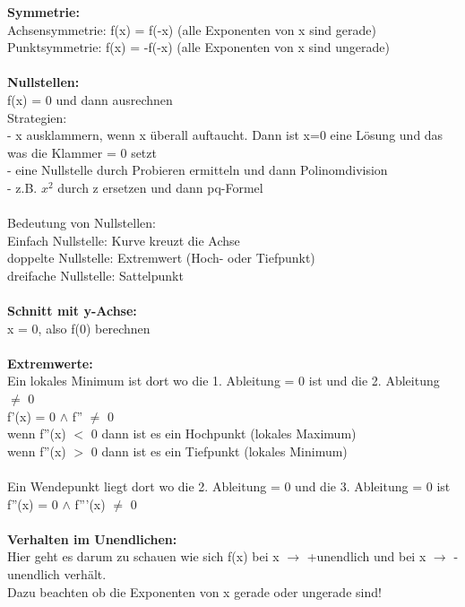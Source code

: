 \documentclass[6pt,a4paper]{scrartcl}
\begin{document}
\begin{multicols*}{2}
\textbf{Symmetrie:}\\
Achsensymmetrie: f(x) = f(-x) (alle Exponenten von x sind gerade)\\
Punktsymmetrie: f(x) = -f(-x) (alle Exponenten von x sind ungerade)\\
\\
\textbf{Nullstellen:}\\
f(x) = 0 und dann ausrechnen\\
Strategien:\\
- x ausklammern, wenn x überall auftaucht. Dann ist x=0 eine Lösung und das was die Klammer = 0 setzt\\
- eine Nullstelle durch Probieren ermitteln und dann Polinomdivision\\
- z.B. $x^2$ durch z ersetzen und dann pq-Formel\\
\\
Bedeutung von Nullstellen:\\
Einfach Nullstelle: Kurve kreuzt die Achse\\
doppelte Nullstelle: Extremwert (Hoch- oder Tiefpunkt)\\
dreifache Nullstelle: Sattelpunkt\\
\\
\textbf{Schnitt mit y-Achse:}\\
x = 0, also f(0) berechnen\\
\\
\textbf{Extremwerte:}\\
Ein lokales Minimum ist dort wo die 1. Ableitung = 0 ist und die 2. Ableitung $\neq$ 0\\
f'(x) = 0 $\land$ f'' $\neq$ 0\\
wenn f''(x) $<$ 0 dann ist es ein Hochpunkt (lokales Maximum)\\
 wenn f''(x) $>$ 0 dann ist es ein Tiefpunkt (lokales Minimum)\\
\\
Ein Wendepunkt liegt dort wo die 2. Ableitung = 0 und die 3. Ableitung = 0 ist\\
f''(x) = 0 $\land$ f'''(x) $\neq$ 0\\
\\
\textbf{Verhalten im Unendlichen:}\\
Hier geht es darum zu schauen wie sich f(x) bei x $\rightarrow$ +unendlich und bei x $\rightarrow$ -unendlich verhält.\\
Dazu beachten ob die Exponenten von x gerade oder ungerade sind!\\
\\

\end{multicols*}
\end{document}
